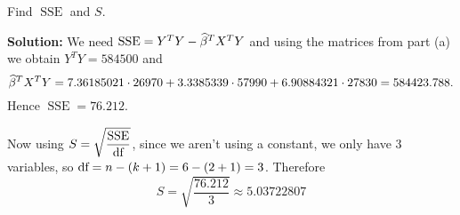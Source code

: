 Find $\operatorname{SSE}$ and $S$.

\nnl \textbf{Solution: } We need $\operatorname{SSE} = Y^TY - \widehat{\beta}^TX^TY$ and using the matrices from part (a) we obtain $Y^TY = \num{584500}$ and $$\widehat{\beta}^TX^TY = 7.36185021\cdot 26970+3.3385339\cdot 57990+6.90884321\cdot 27830 = 584423.788.$$ Hence $\operatorname{SSE} = 76.212$.

\nl Now using $S = \displaystyle \sqrt{\dfrac{\operatorname{SSE}}{\text{df}}}$, since we aren't using a constant, we only have 3 variables, so $\text{df} = n-(k+1) = 6 - (2+1) = 3$. Therefore
$$S = \sqrt{\frac{76.212}{3}} \approx 5.03722807$$